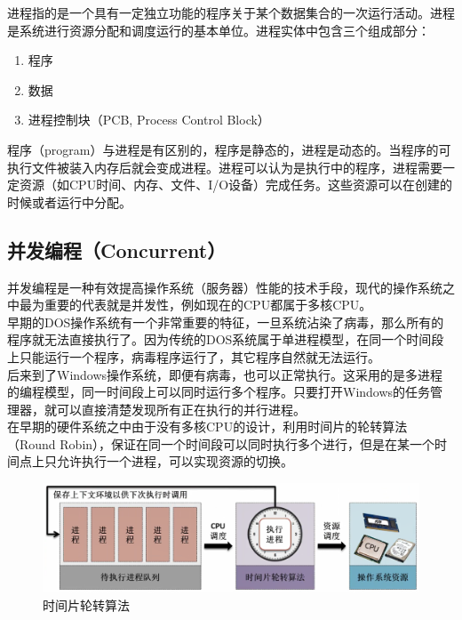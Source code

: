 进程指的是一个具有一定独立功能的程序关于某个数据集合的一次运行活动。进程是系统进行资源分配和调度运行的基本单位。进程实体中包含三个组成部分：

\begin{enumerate}
	\item 程序
	\item 数据
	\item 进程控制块（PCB, Process Control Block）
\end{enumerate}

程序（program）与进程是有区别的，程序是静态的，进程是动态的。当程序的可执行文件被装入内存后就会变成进程。进程可以认为是执行中的程序，进程需要一定资源（如CPU时间、内存、文件、I/O设备）完成任务。这些资源可以在创建的时候或者运行中分配。\\

\subsection{并发编程（Concurrent）}

并发编程是一种有效提高操作系统（服务器）性能的技术手段，现代的操作系统之中最为重要的代表就是并发性，例如现在的CPU都属于多核CPU。\\

早期的DOS操作系统有一个非常重要的特征，一旦系统沾染了病毒，那么所有的程序就无法直接执行了。因为传统的DOS系统属于单进程模型，在同一个时间段上只能运行一个程序，病毒程序运行了，其它程序自然就无法运行。\\

后来到了Windows操作系统，即便有病毒，也可以正常执行。这采用的是多进程的编程模型，同一时间段上可以同时运行多个程序。只要打开Windows的任务管理器，就可以直接清楚发现所有正在执行的并行进程。\\

在早期的硬件系统之中由于没有多核CPU的设计，利用时间片的轮转算法（Round Robin），保证在同一个时间段可以同时执行多个进行，但是在某一个时间点上只允许执行一个进程，可以实现资源的切换。

\begin{figure}[H]
	\centering
	\includegraphics[scale=0.6]{img/C11/11-1/1.png}
	\caption{时间片轮转算法}
\end{figure}

